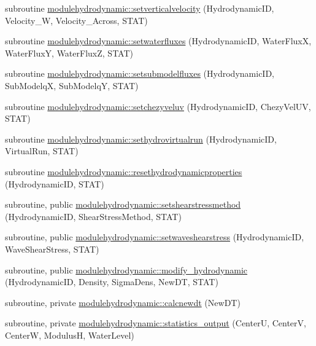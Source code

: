 \begin{DoxyCompactItemize}
\item 
subroutine \mbox{\hyperlink{namespacemodulehydrodynamic_a0ed7fd6441646298396381636f172534}{modulehydrodynamic\+::setverticalvelocity}} (Hydrodynamic\+ID, Velocity\+\_\+W, Velocity\+\_\+\+Across, S\+T\+AT)
\item 
subroutine \mbox{\hyperlink{namespacemodulehydrodynamic_a6c2c32efe21be75b5ffccf7b9d4dbcdb}{modulehydrodynamic\+::setwaterfluxes}} (Hydrodynamic\+ID, Water\+FluxX, Water\+FluxY, Water\+FluxZ, S\+T\+AT)
\item 
subroutine \mbox{\hyperlink{namespacemodulehydrodynamic_ab017d9a33e10a535dcc4b545900925de}{modulehydrodynamic\+::setsubmodelfluxes}} (Hydrodynamic\+ID, Sub\+ModelqX, Sub\+ModelqY, S\+T\+AT)
\item 
subroutine \mbox{\hyperlink{namespacemodulehydrodynamic_a62a3231781314de8d69f6f4216245361}{modulehydrodynamic\+::setchezyveluv}} (Hydrodynamic\+ID, Chezy\+Vel\+UV, S\+T\+AT)
\item 
subroutine \mbox{\hyperlink{namespacemodulehydrodynamic_a429223ac8f920fd2b743524bf353e8c1}{modulehydrodynamic\+::sethydrovirtualrun}} (Hydrodynamic\+ID, Virtual\+Run, S\+T\+AT)
\item 
subroutine \mbox{\hyperlink{namespacemodulehydrodynamic_a81fe705d1430f64e261259b13a8b46f8}{modulehydrodynamic\+::resethydrodynamicproperties}} (Hydrodynamic\+ID, S\+T\+AT)
\item 
subroutine, public \mbox{\hyperlink{namespacemodulehydrodynamic_abc0b4b19014469e3102675a4dbffe103}{modulehydrodynamic\+::setshearstressmethod}} (Hydrodynamic\+ID, Shear\+Stress\+Method, S\+T\+AT)
\item 
subroutine, public \mbox{\hyperlink{namespacemodulehydrodynamic_a820fb4f4565d7dc61e2cfa6517a1390f}{modulehydrodynamic\+::setwaveshearstress}} (Hydrodynamic\+ID, Wave\+Shear\+Stress, S\+T\+AT)
\item 
subroutine, public \mbox{\hyperlink{namespacemodulehydrodynamic_a54656696e009a87a266514744beb5baa}{modulehydrodynamic\+::modify\+\_\+hydrodynamic}} (Hydrodynamic\+ID, Density, Sigma\+Dens, New\+DT, S\+T\+AT)
\item 
subroutine, private \mbox{\hyperlink{namespacemodulehydrodynamic_a63b7d9d86f7746faae381352cdb4ceda}{modulehydrodynamic\+::calcnewdt}} (New\+DT)
\item 
subroutine, private \mbox{\hyperlink{namespacemodulehydrodynamic_ab12f940af5dec2fe8ed4767b7a50fc07}{modulehydrodynamic\+::statistics\+\_\+output}} (CenterU, CenterV, CenterW, ModulusH, Water\+Level)
\item 

\end{DoxyCompactItemize}
